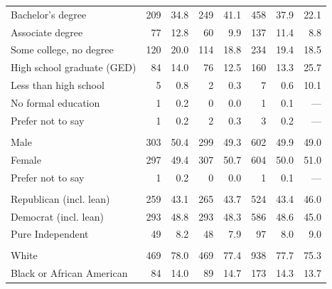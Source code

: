 \begin{table}[!h]
\begin{threeparttable}
\begin{tabular}[t]{lrrrrrrr}
\hspace{1em}Bachelor's degree & 209 & 34.8 & 249 & 41.1 & 458 & 37.9 & 22.1\\
\hspace{1em}Associate degree & 77 & 12.8 & 60 & 9.9 & 137 & 11.4 & 8.8\\
\hspace{1em}Some college, no degree & 120 & 20.0 & 114 & 18.8 & 234 & 19.4 & 18.5\\
\hspace{1em}High school graduate (GED) & 84 & 14.0 & 76 & 12.5 & 160 & 13.3 & 25.7\\
\hspace{1em}Less than high school & 5 & 0.8 & 2 & 0.3 & 7 & 0.6 & 10.1\\
\hspace{1em}No formal education & 1 & 0.2 & 0 & 0.0 & 1 & 0.1 & ---\\
\hspace{1em}Prefer not to say & 1 & 0.2 & 2 & 0.3 & 3 & 0.2 & ---\\
\addlinespace[0.3em]
\multicolumn{8}{l}{\textbf{Sex}}\\
\hspace{1em}Male & 303 & 50.4 & 299 & 49.3 & 602 & 49.9 & 49.0\\
\hspace{1em}Female & 297 & 49.4 & 307 & 50.7 & 604 & 50.0 & 51.0\\
\hspace{1em}Prefer not to say & 1 & 0.2 & 0 & 0.0 & 1 & 0.1 & ---\\
\addlinespace[0.3em]
\multicolumn{8}{l}{\textbf{Political Party}}\\
\hspace{1em}Republican (incl. lean) & 259 & 43.1 & 265 & 43.7 & 524 & 43.4 & 46.0\\
\hspace{1em}Democrat (incl. lean) & 293 & 48.8 & 293 & 48.3 & 586 & 48.6 & 45.0\\
\hspace{1em}Pure Independent & 49 & 8.2 & 48 & 7.9 & 97 & 8.0 & 9.0\\
\addlinespace[0.3em]
\multicolumn{8}{l}{\textbf{Race}}\\
\hspace{1em}White & 469 & 78.0 & 469 & 77.4 & 938 & 77.7 & 75.3\\
\hspace{1em}Black or African American & 84 & 14.0 & 89 & 14.7 & 173 & 14.3 & 13.7\\

\end{tabular}
\end{threeparttable}
\end{table}
